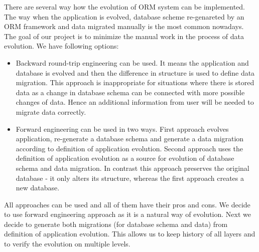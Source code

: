 There are several way how the evolution of ORM system can be implemented. The way when the application is evolved, database scheme re-genareted by an ORM framework and data migrated manually is the most common nowadays. The goal of our project is to minimize the manual work in the process of data evolution. We have following options:
\begin{itemize}
	\item Backward round-trip engineering can be used. It means the application and database is evolved and then the difference in structure is used to define data migration. This approach is inappropriate for situations where there is stored data as a change in database schema can be connected with more possible changes of data. Hence an additional information from user will be needed to migrate data correctly.
    \item Forward engineering can be used in two ways. First approach evolves application, re-generate a database schema and generate a data migration according to definition of application evolution. Second approach uses the definition of application evolution as a source for evolution of database schema and data migration. In contrast this approach preserves the original database - it only alters its structure, whereas the first approach creates a new database.
\end{itemize}
All approaches can be used and all of them have their pros and cons. We decide to use forward engineering approach as it is a natural way of evolution. Next we decide to generate both migrations (for database schema and data) from definition of application evolution. This allows us to keep history of all layers and to verify the evolution on multiple levels. 
